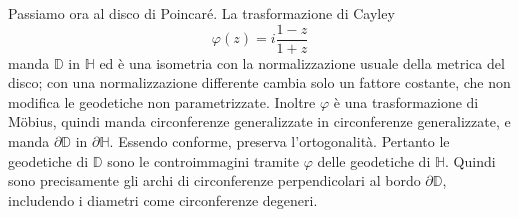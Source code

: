 \documentclass[a4paper]{article}
\begin{document}
\begin{snippetproof}{}
    Passiamo ora al disco di Poincaré. La trasformazione di Cayley
    \[
        \varphi(z)=i\frac{1-z}{1+z}
    \]
    manda \(\mathbb{D}\) in \(\mathbb{H}\) ed è una isometria con la normalizzazione usuale della metrica del disco; con una normalizzazione differente cambia solo un fattore costante, che non modifica le geodetiche non parametrizzate. Inoltre \(\varphi\) è una trasformazione di Möbius, quindi manda circonferenze generalizzate in circonferenze generalizzate, e manda \(\partial\mathbb{D}\) in \(\partial\mathbb{H}\). Essendo conforme, preserva l'ortogonalità.
    Pertanto le geodetiche di \(\mathbb{D}\) sono le controimmagini tramite \(\varphi\) delle geodetiche di \(\mathbb{H}\). Quindi sono precisamente gli archi di circonferenze perpendicolari al bordo \(\partial\mathbb{D}\), includendo i diametri come circonferenze degeneri.
\end{snippetproof}

\end{document}
